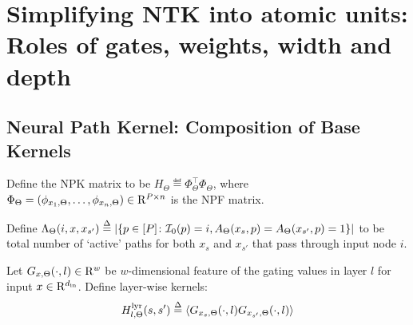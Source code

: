 \section{Simplifying NTK into atomic units: Roles of gates, weights, width and depth}

\subsection{Neural Path Kernel: Composition of Base Kernels}
\begin{definition}
Define the NPK matrix to be  $H_{\Theta}\eqdef\Phi^\top_{\Theta}\Phi_{\Theta}$, where $\Phi_{\Theta}=(\phi_{x_1,\Theta},\ldots,\phi_{x_n,\Theta})\in\mathrm{R}^{P\times n}$ is the NPF matrix.
\end{definition}

\begin{definition}\label{def:cnnlambda}
 Define $\Lambda_{\Theta}(i,x,x_{s'}) \stackrel{\Delta}{=} \left|\{p\in[P]\colon  \mathcal{I}_0(p)=i, A_{\Theta}(x_s,p)= A_{\Theta}(x_{s'},p)=1\}\right|$ to be total number of `active' paths for both $x_s$ and $x_{s'}$ that pass through input node $i$.
\end{definition}
%
\begin{definition}\label{def:layerkernel} Let $G_{x,\Theta}(\cdot,l)\in\mathrm{R}^w$ be $w$-dimensional feature of the gating values in layer $l$ for input $x\in\mathrm{R}^{d_{\text{in}}}$.  Define layer-wise kernels:
\begin{align*}
H^{\text{lyr}}_{l,\Theta}(s,s')\stackrel{\Delta}{=}\langle G_{x_s,\Theta}(\cdot,l)G_{x_{s'},\Theta}(\cdot,l)\rangle
\end{align*}
\end{definition}

